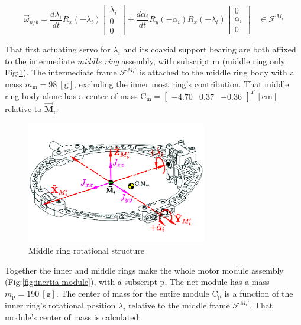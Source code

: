 \begin{equation}\label{eq:net-angular-inner}
\vec{\omega}_{n/b}=\frac{d\lambda_i}{dt}R_x(-\lambda_i)\begin{bmatrix}
\lambda_i\\
0\\
0
\end{bmatrix}
+\frac{d\alpha_i}{dt}R_y(-\alpha_i)R_x(-\lambda_i)\begin{bmatrix}
0\\
\alpha_i\\
0
\end{bmatrix}~~~~\in\mathcal{F}^{M_i}
\end{equation}
\par
That first actuating servo for $\lambda_i$ and its coaxial support bearing are both affixed to the intermediate \emph{middle ring} assembly, with subscript m (middle ring only Fig:\ref{fig:inertia-middle}). The intermediate frame $\mathcal{F}^{M_i'}$ is attached to the middle ring body with a mass $m_\text{m}=98~[\text{g}]$, \underline{excluding} the inner most ring's contribution. That middle ring body alone has a center of mass $\text{C}_{\text{m}}=\begin{bmatrix}
-4.70&0.37&-0.36\end{bmatrix}^T~[\text{cm}]$ relative to $\vec{\mathbf{M}}_i$. 
\begin{figure}[htbp]
\centering
\includegraphics[width=0.7\textwidth]{figs/inertia-middle}
\vspace{-18pt}
\caption{Middle ring rotational structure}
\label{fig:inertia-middle}
\vspace{-12pt}
\end{figure}
\par
Together the inner and middle rings make the whole motor module assembly (Fig:\ref{fig:inertia-module}), with a subscript p. The net module has a mass $m_\text{p}=190~[\text{g}]$. The center of mass for the entire module $\text{C}_\text{p}$ is a function of the inner ring's rotational position $\lambda_i$ relative to the middle frame $\mathcal{F}^{M_i'}$. That module's center of mass is calculated:
